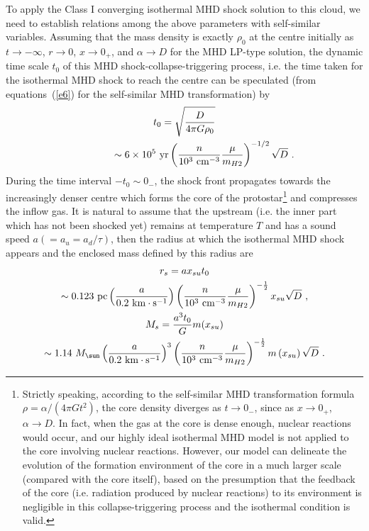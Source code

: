 \documentclass[fleqn,usenatbib]{mnras}
\begin{document}
To apply the Class I converging isothermal MHD shock solution to this cloud, we need to establish relations among the above parameters with self-similar variables. Assuming that the mass density is exactly $\rho_{0}$ at the centre initially as $t\rightarrow -\infty$, $r\rightarrow 0$, $x\rightarrow 0_{+}$, and $\alpha\rightarrow D$ for the MHD LP-type solution, the dynamic time scale $t_{0}$ of this MHD shock-collapse-triggering process, i.e. the time taken for the isothermal MHD shock to reach the centre can be speculated (from equations~(\ref{e6}) for the self-similar MHD transformation) by 
\begin{gather}
t_{0}=\sqrt{\frac{D}{4\pi G\rho_{0}}}\notag\\
\qquad\qquad\sim 6\times 10^{5}~\mathrm{yr} \left(\frac{n}{10^{3}~\mathrm{cm^{-3}}}
 \frac{\mu}{m_{H2}}\right)^{-1/2}\sqrt{D}\ .\label{e44}
\end{gather}
During the time interval $-t_{0}\sim 0_{-}$, the shock front propagates towards the increasingly denser centre which forms the core of the protostar\footnote{\label{f14}Strictly speaking, according to the self-similar MHD transformation formula $\rho=\alpha/\left(4\pi Gt^{2}\right)$, the core density diverges as $t\rightarrow 0_{-}$, since as $x\rightarrow 0_{+}$, $\alpha\rightarrow D$. In fact, when the gas at the core is dense enough, nuclear reactions would occur, and our highly ideal isothermal MHD model is not applied to the core involving nuclear reactions. However, our model can delineate the evolution of the formation environment of the core in a much larger scale (compared with the core itself), based on the presumption that the feedback of the core (i.e. radiation produced by nuclear reactions) to its environment is negligible in this collapse-triggering process and the isothermal condition is valid.} and compresses the inflow gas. It is natural to assume that the upstream (i.e. the inner part which has not been shocked yet) remains at temperature $T$ and has a sound speed $a(=a_{u}=a_{d}/\tau)$, then the radius at which the isothermal MHD shock appears and the enclosed mass defined by this radius are
\begin{gather}
r_{s}=a x_{su}t_{0}\notag\\
\sim 0.123~\mathrm{pc} \left(\frac{a}{0.2~\mathrm{km\cdot s^{-1}}}\right)\left(\frac{n}{10^{3}~\mathrm{cm^{-3}}}\frac{\mu}{m_{H2}}\right)^{-\frac{1}{2}}x_{su}\sqrt{D}\ ,\label{e45}\\
M_{s}=\frac{a^{3}t_{0}}{G}m(x_{su})\notag\\
\sim 1.14~M_{\sun}\left(\frac{a}{0.2~\mathrm{km\cdot s^{-1}}}\right)^{3}\left(\frac{n}{10^{3}~\mathrm{cm^{-3}}}\frac{\mu}{m_{H2}}\right)^{-\frac{1}{2}}m\left(x_{su}\right)\sqrt{D}\ .\label{e46}
\end{gather}
\end{document}

